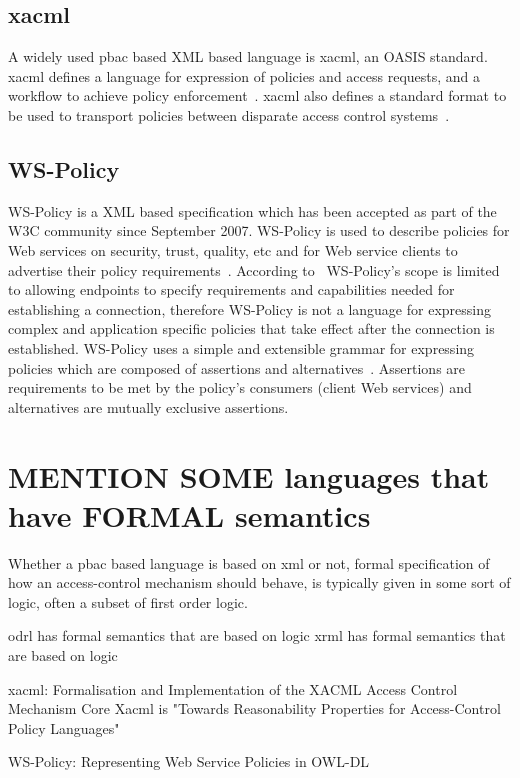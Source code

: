 \subsection{xacml}
A widely used \ac{pbac} based XML based language is \ac{xacml}, an OASIS standard. \ac{xacml} defines a language for expression of policies and access requests, and a workflow to achieve policy enforcement~\cite{DBLP:conf/essos/MasiPT12}. \ac{xacml} also defines a standard format to be used to transport policies
between disparate access control systems~\cite{ArdagnaDVS04}.

\subsection{WS-Policy}
WS-Policy is a XML based specification which has been accepted as part of the W3C community since September 2007. WS-Policy is used to describe policies for Web services on security, trust, quality, etc and for Web service clients to advertise their policy requirements~\cite{wspolicy}.
According to~\cite{wspolicy} WS-Policy's scope is limited to allowing endpoints to specify requirements and capabilities needed for establishing a connection, therefore WS-Policy is not a language for expressing complex and application specific policies that take effect after the connection is established. WS-Policy uses a simple and extensible grammar for expressing policies which are composed of assertions and alternatives~\cite{wspolicy}. Assertions are requirements to be met by the policy's consumers (client Web services) and alternatives are mutually exclusive assertions. 

\section{MENTION SOME languages that have FORMAL semantics}

Whether a \ac{pbac} based language is based on \ac{xml} or not, formal specification of how an access-control mechanism should behave, is typically given in some sort of logic, often a subset of first order logic. 

odrl has formal semantics that are based on logic
xrml has formal semantics that are based on logic

xacml: 
Formalisation and Implementation of the XACML Access Control Mechanism
Core Xacml is "Towards Reasonability Properties for Access-Control Policy Languages"

WS-Policy:
Representing Web Service Policies in OWL-DL

